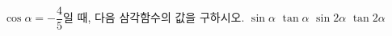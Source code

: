 $\cos\alpha=-\dfrac{4}{5}$일 때, 다음 삼각함수의 값을 구하시오. 
 $\sin\alpha$
 $\tan\alpha$
 $\sin 2\alpha$
 $\tan 2\alpha$
